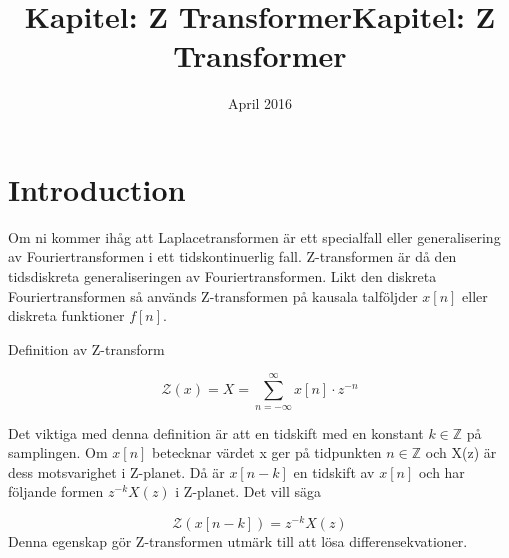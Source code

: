 \documentclass{article}
\title{Kapitel: Z Transformer}
\author{ }
\date{April 2016}
\title{Kapitel: Z Transformer}
\begin{document}
\maketitle

\section{Introduction}

Om ni kommer ihåg att Laplacetransformen är ett specialfall eller generalisering av Fouriertransformen i ett
tidskontinuerlig fall. Z-transformen är då den tidsdiskreta generaliseringen av Fouriertransformen.
Likt den diskreta Fouriertransformen så används Z-transformen på kausala talföljder $x[n]$ eller
diskreta funktioner $f[n]$. %

Definition av Z-transform

$$\mathcal{Z}(x) = X = \sum_{n=-\infty}^{\infty} x[n] \cdot z^{-n} $$

Det viktiga med denna definition är att en tidskift med en konstant $k \in \mathbb{Z}$ på samplingen. Om $x[n]$ betecknar värdet x ger på tidpunkten $n \in \mathbb{Z}$ och X(z) är dess motsvarighet i Z-planet. Då är $x[n-k]$ en tidskift av $x[n]$ och har följande formen $z^{-k} X(z)$ i  Z-planet. Det vill säga 


$$\mathcal{Z}(x[n-k]) = z^{-k} X(z) $$
Denna egenskap gör Z-transformen utmärk till att lösa differensekvationer. 


\appendix
\end{document}

